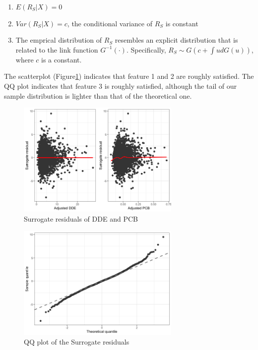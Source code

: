\documentclass[wcp]{jmlr}%
\begin{document}
\begin{enumerate}
	\item $E(R_S|X)=0$
	\item $Var(R_S|X)=c$, the conditional variance of $R_S$ is constant
	\item The emprical distribution of $R_S$ resembles an explicit distribution that is related to the link function $G^{-1}(\cdot)$. Specifically, $R_S\sim G(c+\int ud G(u))$, where $c$ is a constant.
\end{enumerate}

The scatterplot (Figure\ref{fig:surrogateresid}) indicates that feature 1 and 2 are roughly satisfied. The QQ plot indicates that feature 3 is roughly satisfied, although the tail of our sample distribution is lighter than that of the theoretical one. 

\begin{figure}
	\centering
	\includegraphics[width=0.7\textwidth]{Surrogate_residuals.png}
	\caption{Surrogate residuals of DDE and PCB}
	\label{fig:surrogateresid}
\end{figure}

\begin{figure}
	\centering
	\includegraphics[width=0.7\textwidth]{qqplot.png}
	\caption{QQ plot of the Surrogate residuals}
	\label{fig:qqplot}
\end{figure}





%
\end{document}
